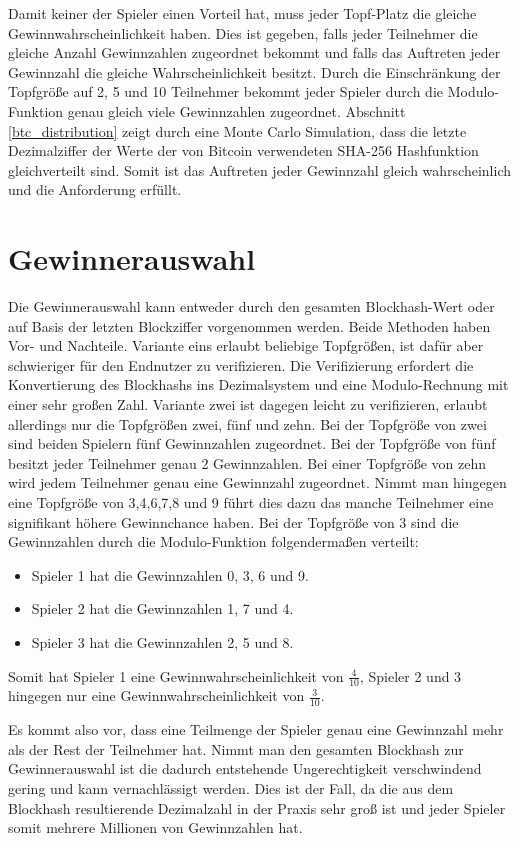 Damit keiner der Spieler einen Vorteil hat, muss jeder Topf-Platz die gleiche Gewinnwahrscheinlichkeit haben.
Dies ist gegeben, falls jeder Teilnehmer die gleiche Anzahl Gewinnzahlen zugeordnet bekommt und falls das Auftreten jeder Gewinnzahl die gleiche Wahrscheinlichkeit besitzt. Durch die Einschränkung der Topfgröße auf 2, 5 und 10 Teilnehmer bekommt jeder Spieler durch die Modulo-Funktion genau gleich viele Gewinnzahlen zugeordnet. Abschnitt \ref{btc_distribution} zeigt durch eine Monte Carlo Simulation, dass die letzte Dezimalziffer der Werte der von Bitcoin verwendeten SHA-256 Hashfunktion gleichverteilt sind. Somit ist das Auftreten jeder Gewinnzahl gleich wahrscheinlich und die Anforderung erfüllt.

\section{Gewinnerauswahl}\label{btc_gewinnerauswahl}
Die Gewinnerauswahl kann entweder durch den gesamten Blockhash-Wert oder auf Basis der letzten Blockziffer vorgenommen werden.
Beide Methoden haben Vor- und Nachteile. Variante eins erlaubt beliebige Topfgrößen, ist dafür aber schwieriger für den Endnutzer zu verifizieren. Die Verifizierung erfordert die Konvertierung des Blockhashs ins Dezimalsystem und eine Modulo-Rechnung mit einer sehr großen Zahl. Variante zwei ist dagegen leicht zu verifizieren, erlaubt allerdings nur die Topfgrößen zwei, fünf und zehn. Bei der Topfgröße von zwei sind beiden Spielern fünf Gewinnzahlen zugeordnet. Bei der Topfgröße von fünf besitzt jeder Teilnehmer genau 2 Gewinnzahlen. Bei einer Topfgröße von zehn wird jedem Teilnehmer genau eine Gewinnzahl zugeordnet. 
Nimmt man hingegen eine Topfgröße von 3,4,6,7,8 und 9 führt dies dazu das manche Teilnehmer eine signifikant höhere Gewinnchance haben.
Bei der Topfgröße von 3 sind die Gewinnzahlen durch die Modulo-Funktion folgendermaßen verteilt:
\begin{itemize}
\item Spieler 1 hat die Gewinnzahlen 0, 3, 6 und 9.
\item Spieler 2 hat die Gewinnzahlen 1, 7 und 4.
\item Spieler 3 hat die Gewinnzahlen 2, 5 und 8.
\end{itemize}
Somit hat Spieler 1 eine Gewinnwahrscheinlichkeit von $\frac{4}{10}$, Spieler 2 und 3 hingegen nur eine Gewinnwahrscheinlichkeit von $\frac{3}{10}$.

Es kommt also vor, dass eine Teilmenge der Spieler genau eine Gewinnzahl mehr als der Rest der Teilnehmer hat.
Nimmt man den gesamten Blockhash zur Gewinnerauswahl ist die dadurch entstehende Ungerechtigkeit verschwindend gering und kann vernachlässigt werden. Dies ist der Fall, da die aus dem Blockhash resultierende Dezimalzahl in der Praxis sehr groß ist und jeder Spieler somit mehrere Millionen von Gewinnzahlen hat.

